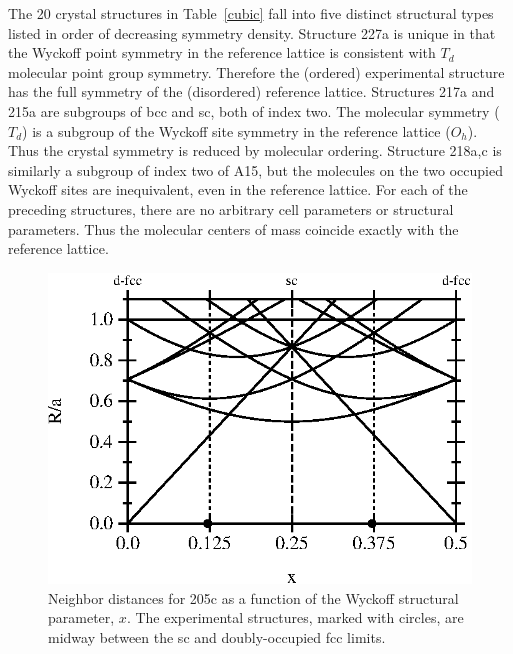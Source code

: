 \documentclass[preprint]{iucr}              %
\begin{document}
The 20 crystal structures in Table~\ref{cubic} fall into five
distinct structural types listed in order of decreasing symmetry
density. Structure 227a is unique in that the Wyckoff point symmetry
in the reference lattice is consistent with $T_d$ molecular point
group symmetry. Therefore the (ordered) experimental structure has
the full symmetry of the (disordered) reference lattice. Structures
217a and 215a are subgroups of bcc and sc, both of index two. The
molecular symmetry ($T_d$) is a subgroup of the Wyckoff site
symmetry in the reference lattice ($O_h$). Thus the crystal symmetry
is reduced by molecular ordering. Structure 218a,c is similarly a
subgroup of index two of A15, but the molecules on the two occupied
Wyckoff sites are inequivalent, even in the reference lattice.  For
each of the preceding structures, there are no arbitrary cell
parameters or structural parameters. Thus the molecular centers of
mass coincide exactly with the reference lattice.


\begin{figure}
\begin{center}
\includegraphics{205c.eps}
\end{center}
\caption[Neighbor distances for 205c as a function of $x$]{Neighbor
distances for 205c as a function of the Wyckoff structural
parameter, $x$.  The experimental structures, marked with circles,
are midway between the sc and doubly-occupied fcc limits.}
\label{fig:205c}
\end{figure}
\end{document}
